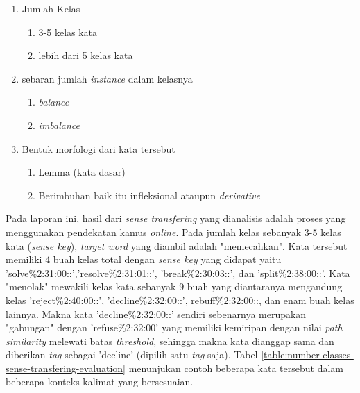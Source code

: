\begin{enumerate}
	\item Jumlah Kelas
	\begin{enumerate}
		\item 3-5 kelas kata
		\item lebih dari 5 kelas kata
	\end{enumerate}
	\item sebaran jumlah \textit{instance} dalam kelasnya
	\begin{enumerate}
		\item \textit{balance}
		\item \textit{imbalance}
	\end{enumerate}
	\item Bentuk morfologi dari kata tersebut
	\begin{enumerate}
		\item Lemma (kata dasar)
		\item Berimbuhan baik itu infleksional ataupun \textit{derivative}
	\end{enumerate}
\end{enumerate}

Pada laporan ini, hasil dari \textit{sense transfering} yang dianalisis adalah proses yang menggunakan pendekatan kamus \textit{online}. Pada jumlah kelas sebanyak 3-5 kelas kata (\textit{sense key}), \textit{target word} yang diambil adalah "memecahkan". Kata tersebut memiliki 4 buah kelas total dengan \textit{sense key} yang didapat yaitu 'solve\%2:31:00::','resolve\%2:31:01::', 'break\%2:30:03::', dan 'split\%2:38:00::'. Kata "menolak" mewakili kelas kata sebanyak 9 buah yang diantaranya mengandung kelas 'reject\%2:40:00::', 'decline\%2:32:00::', rebuff\%2:32:00::, dan enam buah kelas lainnya. Makna kata 'decline\%2:32:00::' sendiri sebenarnya merupakan "gabungan" dengan 'refuse\%2:32:00' yang memiliki kemiripan dengan nilai \textit{path similarity} melewati batas \textit{threshold}, sehingga makna kata dianggap sama dan diberikan \textit{tag} sebagai 'decline' (dipilih satu \textit{tag} saja). Tabel \ref{table:number-classes-sense-transfering-evaluation} menunjukan contoh beberapa kata tersebut dalam beberapa konteks kalimat yang bersesuaian.


